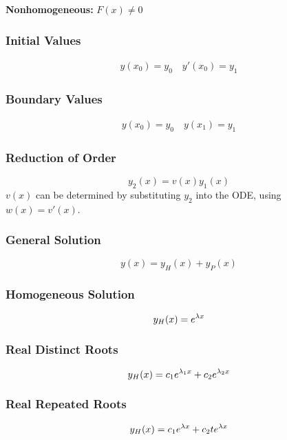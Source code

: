 \documentclass{article}
\begin{document}
\begin{multicols}{3}
    \textbf{Nonhomogeneous:} $F(x) \neq 0$
    \subsubsection*{Initial Values}
    \begin{align*}
        y(x_0) = y_0 \quad y'(x_0) = y_1
    \end{align*}
    \subsubsection*{Boundary Values}
    \begin{align*}
        y(x_0) = y_0 \quad y(x_1) = y_1
    \end{align*}
    \subsubsection*{Reduction of Order}
    \begin{equation*}
        y_2(x) = v\left(x\right) y_1(x)
    \end{equation*}
    $v(x)$ can be determined by substituting $y_2$ into the ODE, using $w(x) = v'(x)$.
    \subsubsection*{General Solution}
    \begin{equation*}
        y(x) = y_H(x) + y_P(x)
    \end{equation*}
    \subsubsection*{Homogeneous Solution}
    \begin{equation*}
        y_H(x) = e^{\lambda x}
    \end{equation*}
    \subsubsection*{Real Distinct Roots}
    \begin{equation*}
        y_H(x) = c_1e^{\lambda_1 x} + c_2e^{\lambda_2 x}
    \end{equation*}
    \subsubsection*{Real Repeated Roots}
    \begin{equation*}
        y_H(x) = c_1e^{\lambda x} + c_2 te^{\lambda x}
    \end{equation*}

\end{multicols}
\end{document}
